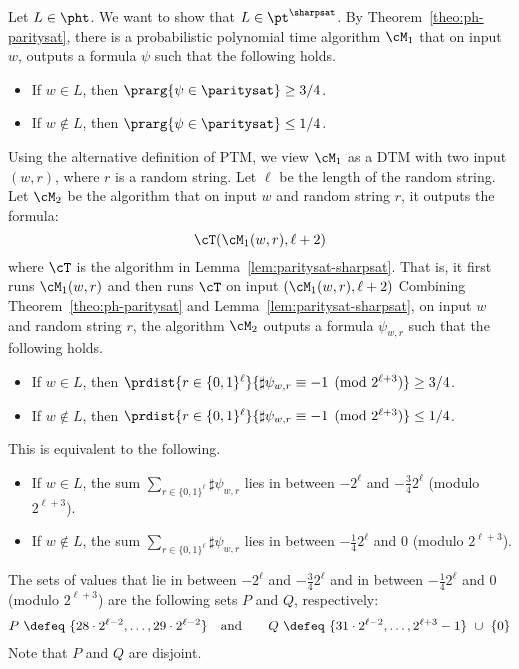 \documentclass[11pt, a4paper]{article}
\begin{document}
Let $L \in \pht$.
We want to show that $L \in \pt^{\sharpsat}$.
By Theorem~\ref{theo:ph-paritysat},
there is a probabilistic polynomial time algorithm $\cM_1$ that
on input $w$, outputs a formula $\psi$ such that the following holds.
\begin{itemize}
\item
If $w \in L$, then $\prarg { \psi \in \paritysat} \geq 3/4$.
\item
If $w \notin L$, then $\prarg { \psi \in \paritysat} \leq 1/4$.
\end{itemize}
Using the alternative definition of PTM, we view $\cM_1$ as a DTM
with two input $(w,r)$, where $r$ is a random string.
Let $\ell$ be the length of the random string.
Let $\cM_2$ be the algorithm
that on input $w$ and random string $r$, it outputs the formula:
$$
\cT(\cM_1(w,r),\ell+2)
$$
where $\cT$ is the algorithm in Lemma~\ref{lem:paritysat-sharpsat}.
That is, it first runs $\cM_1(w,r)$ and then runs $\cT$ on input $(\cM_1(w,r),\ell+2)$ 
Combining Theorem~\ref{theo:ph-paritysat} and Lemma~\ref{lem:paritysat-sharpsat},
on input $w$ and random string $r$, 
the algorithm $\cM_2$ outputs a formula $\psi_{w,r}$ such that the following holds.
\begin{itemize}
\item
If $w \in L$, then $\prdist {r\in \{0,1\}^{\ell}} { \sharp\psi_{w,r} \equiv -1 \pmod {2^{\ell+3}}} \geq 3/4$.
\item
If $w \notin L$, then $\prdist {r\in \{0,1\}^{\ell}} { \sharp\psi_{w,r} \equiv -1 \pmod {2^{\ell+3}}} \leq 1/4$.
\end{itemize}
This is equivalent to the following.
\begin{itemize}
\item
If $w \in L$, 
the sum $\sum_{r\in \{0,1\}^{\ell}} \sharp\psi_{w,r}$ lies in between $-2^{\ell}$ and $-\frac{3}{4}2^{\ell}$ (modulo $2^{\ell+3}$).
\item
If $w \notin L$, 
the sum $\sum_{r\in \{0,1\}^{\ell}} \sharp\psi_{w,r}$ lies in between $-\frac{1}{4}2^{\ell}$ and $0$ (modulo $2^{\ell+3}$).
\end{itemize}
The sets of values that lie in between $-2^{\ell}$ and $-\frac{3}{4}2^{\ell}$ 
and in between $-\frac{1}{4}2^{\ell}$ and $0$ (modulo $2^{\ell+3}$) are the following sets $P$ and $Q$, respectively:
\begin{eqnarray*}
P \ \defeq \
\{28\cdot 2^{\ell-2},\ldots,29\cdot2^{\ell-2}\}
& \quad\text{and}\quad &
Q \ \defeq \
\{31\cdot 2^{\ell-2},\ldots,2^{\ell+3}-1\}\ \cup\ \{0\}
\end{eqnarray*}
Note that $P$ and $Q$ are disjoint.
\end{document}
